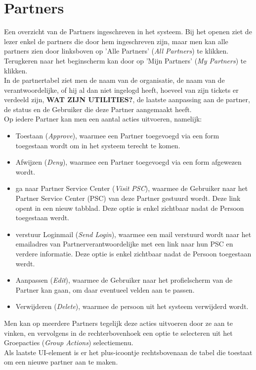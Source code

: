 \documentclass[]{memoir}
\begin{document}
\section{Partners} \label{Partners}
Een overzicht van de Partners ingeschreven in het systeem. Bij het openen ziet de lezer enkel de partners die door hem ingeschreven zijn, maar men kan alle partners zien door linksboven op 'Alle Partners' (\textsl{All Partners}) te klikken. Terugkeren naar het beginscherm kan door op 'Mijn Partners' (\textsl{My Partners}) te klikken.\\
In de partnertabel ziet men de naam van de organisatie, de naam van de verantwoordelijke, of hij al dan niet ingelogd heeft, hoeveel van zijn tickets er verdeeld zijn, \textbf{WAT ZIJN UTILITIES?}, de laatste aanpassing aan de partner, de status en de Gebruiker die deze Partner aangemaakt heeft.\\
Op iedere Partner kan men een aantal acties uitvoeren, namelijk:
\begin{itemize}
	\item Toestaan (\textsl{Approve}), waarmee een Partner toegevoegd via een form  toegestaan wordt om in het systeem terecht te komen.
	\item Afwijzen  (\textsl{Deny}), waarmee een Partner toegevoegd via een form  afgewezen wordt.
	\item ga naar Partner Service Center  (\textsl{Visit PSC}), waarmee de Gebruiker naar het Partner Service Center (PSC) van deze Partner gestuurd wordt. Deze link opent in een nieuw tabblad. Deze optie is enkel zichtbaar nadat de Persoon toegestaan werdt.
	\item verstuur Loginmail  (\textsl{Send Login}), waarmee een mail verstuurd wordt naar het emailadres van Partnerverantwoordelijke met een link naar hun PSC en verdere informatie. Deze optie is enkel zichtbaar nadat de Persoon toegestaan werdt.
	\item Aanpassen (\textsl{Edit}), waarmee de Gebruiker naar het profielscherm van de Partner kan gaan, om daar eventueel velden aan te passen.
	\item Verwijderen (\textsl{Delete}), waarmee de persoon uit het systeem verwijderd wordt.
\end{itemize}
Men kan op meerdere Partners tegelijk deze acties uitvoeren door ze aan te vinken, en vervolgens in de rechterbovenhoek een optie te selecteren uit het Groepacties  (\textsl{Group Actions}) selectiemenu.\\
Als laatste UI-element is er het plus-icoontje rechtsbovenaan de tabel die toestaat om een nieuwe partner aan te maken.
\end{document}
